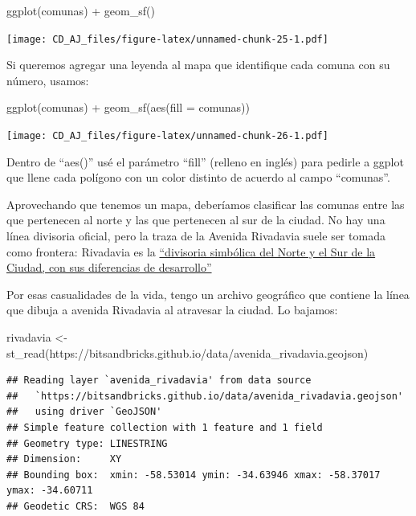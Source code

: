 \documentclass[
]{book}
\newenvironment{Shaded}{\begin{snugshade}}{\end{snugshade}}
\newcommand{\AttributeTok}[1]{\textcolor[rgb]{0.77,0.63,0.00}{#1}}
\newcommand{\FunctionTok}[1]{\textcolor[rgb]{0.00,0.00,0.00}{#1}}
\newcommand{\NormalTok}[1]{#1}
\newcommand{\OtherTok}[1]{\textcolor[rgb]{0.56,0.35,0.01}{#1}}
\newcommand{\SpecialCharTok}[1]{\textcolor[rgb]{0.00,0.00,0.00}{#1}}
\newcommand{\StringTok}[1]{\textcolor[rgb]{0.31,0.60,0.02}{#1}}
\begin{document}
\begin{Shaded}
\begin{Highlighting}[]
\FunctionTok{ggplot}\NormalTok{(comunas) }\SpecialCharTok{+}
    \FunctionTok{geom\_sf}\NormalTok{()}
\end{Highlighting}
\end{Shaded}

\texttt{[image: CD\_AJ\_files/figure-latex/unnamed-chunk-25-1.pdf]}

Si queremos agregar una leyenda al mapa que identifique cada comuna con su número, usamos:

\begin{Shaded}
\begin{Highlighting}[]
\FunctionTok{ggplot}\NormalTok{(comunas) }\SpecialCharTok{+}
    \FunctionTok{geom\_sf}\NormalTok{(}\FunctionTok{aes}\NormalTok{(}\AttributeTok{fill =}\NormalTok{ comunas))}
\end{Highlighting}
\end{Shaded}

\texttt{[image: CD\_AJ\_files/figure-latex/unnamed-chunk-26-1.pdf]}

Dentro de ``aes()'' usé el parámetro ``fill'' (relleno en inglés) para pedirle a ggplot que llene cada polígono con un color distinto de acuerdo al campo ``comunas''.

Aprovechando que tenemos un mapa, deberíamos clasificar las comunas entre las que pertenecen al norte y las que pertenecen al sur de la ciudad. No hay una línea divisoria oficial, pero la traza de la Avenida Rivadavia suele ser tomada como frontera: Rivadavia es la \href{https://www.clarin.com/ediciones-anteriores/avenida-rivadaviaun-largo-recorrido-contrastes_0_B1reo181CYe.html}{``divisoria simbólica del Norte y el Sur de la Ciudad, con sus diferencias de desarrollo''}

Por esas casualidades de la vida, tengo un archivo geográfico que contiene la línea que dibuja a avenida Rivadavia al atravesar la ciudad. Lo bajamos:

\begin{Shaded}
\begin{Highlighting}[]
\NormalTok{rivadavia }\OtherTok{\textless{}{-}} \FunctionTok{st\_read}\NormalTok{(}\StringTok{\textquotesingle{}https://bitsandbricks.github.io/data/avenida\_rivadavia.geojson\textquotesingle{}}\NormalTok{)}
\end{Highlighting}
\end{Shaded}

\begin{verbatim}
## Reading layer `avenida_rivadavia' from data source 
##   `https://bitsandbricks.github.io/data/avenida_rivadavia.geojson' 
##   using driver `GeoJSON'
## Simple feature collection with 1 feature and 1 field
## Geometry type: LINESTRING
## Dimension:     XY
## Bounding box:  xmin: -58.53014 ymin: -34.63946 xmax: -58.37017 ymax: -34.60711
## Geodetic CRS:  WGS 84
\end{verbatim}
\end{document}
